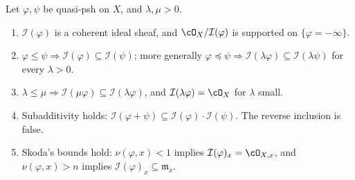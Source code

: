 \begin{proposition}\label{prop:ch51-ideal-formal}
Let \(\varphi,\psi\) be quasi-psh on \(X\), and \(\lambda,\mu>0\).
\begin{enumerate}
\item\label{itm:ch51-if:coherent}
      \(\mathcal I(\varphi)\) is a coherent ideal sheaf, and
      \(\cO_X/\mathcal I(\varphi)\) is supported on
      \(\{\varphi=-\infty\}\).
\item\label{itm:ch51-if:monotone}
      \(\varphi\leq\psi\Rightarrow
      \mathcal I(\varphi)\subseteq\mathcal I(\psi)\); more generally
      \(\varphi\preceq\psi\Rightarrow
      \mathcal I(\lambda\varphi)\subseteq\mathcal I(\lambda\psi)\) for
      every \(\lambda>0\).
\item\label{itm:ch51-if:scale}
      \(\lambda\leq\mu\Rightarrow
      \mathcal I(\mu\varphi)\subseteq\mathcal I(\lambda\varphi)\), and
      \(\mathcal I(\lambda\varphi)=\cO_X\) for \(\lambda\) small.
\item\label{itm:ch51-if:product}
      Subadditivity holds:
      \(\mathcal I(\varphi+\psi)\subseteq
      \mathcal I(\varphi)\cdot\mathcal I(\psi)\).  The reverse inclusion
      is false.
\item\label{itm:ch51-if:skoda-bounds}
      Skoda's bounds hold:
      \(\nu(\varphi,x)<1\) implies
      \(\mathcal I(\varphi)_x=\cO_{X,x}\), and
      \(\nu(\varphi,x)>n\) implies
      \(\mathcal I(\varphi)_x\subseteq\mathfrak m_x\).
\end{enumerate}
\end{proposition}

